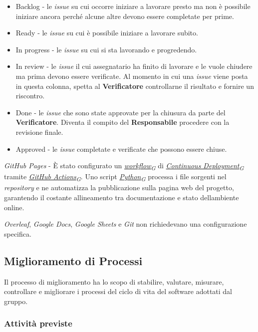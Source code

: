\documentclass[12pt, a4paper]{article}
\newcommand{\urlglossario}{https://skynetunigroup.github.io/Code_Guardian/Documentazione/PB/glossario_v2.0.0.pdf} %
\newcommand{\glo}[2]{\href{\urlglossario\#nameddest=#2}{#1\textsubscript{G}}}
\begin{document}
\begin{itemize}
\item
  Backlog - le \textit{issue} su cui occorre iniziare a lavorare presto ma non è possibile iniziare ancora perché alcune altre devono essere completate per prime.
 \item
  Ready - le \textit{issue} su cui è possibile iniziare a lavorare subito.
 \item
  In progress - le \textit{issue} su cui si sta lavorando e progredendo.
 \item
  In review - le \textit{issue} il cui assegnatario ha finito di lavorare e le vuole chiudere ma prima devono essere verificate. Al momento in cui una \textit{issue} viene posta in questa colonna, spetta al \textbf{Verificatore} controllarne il risultato e fornire un riscontro.
 \item
  Done - le \textit{issue} che sono state approvate per la chiusura da parte del \textbf{Verificatore}. Diventa il compito del \textbf{Responsabile} procedere con la revisione finale.
 \item
  Approved - le \textit{issue} completate e verificate che possono essere chiuse.
 \end{itemize}

\textit{GitHub Pages} - È stato configurato un \textit{\glo{workflow}{workflow}} di \textit{\glo{Continuous Deployment}{continuous-deployment}} tramite \textit{\glo{GitHub Actions}{github-actions}}. Uno script \textit{\glo{Python}{python}} processa i file sorgenti nel \textit{repository} e ne automatizza la pubblicazione sulla pagina web del progetto, garantendo il costante allineamento tra documentazione e stato dell\textquotesingle ambiente online.

 \textit{Overleaf}, \textit{Google Docs}, \textit{Google Sheets} e \textit{Git} non richiedevano una configurazione specifica.

 \newpage
 \subsection{Miglioramento di Processi}

Il processo di miglioramento ha lo scopo di stabilire, valutare, misurare, controllare e migliorare i processi del ciclo di vita del software adottati dal gruppo.

 \subsubsection{Attività previste}
\end{document}
